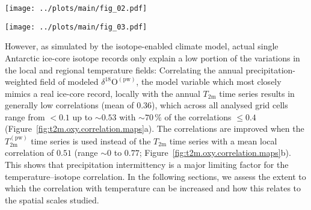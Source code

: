 \documentclass[draft]{agujournal2019}
\begin{document}
\begin{figure*}[t]%
\centering
\texttt{[image: ../plots/main/fig\_02.pdf]}
\caption{%
  Temperature decorrelation lengths across Antarctica. The temperature
  decorrelation lengths ($\tau$, in km) for each Antarctic model grid cell were
  estimated by fitting an exponential model to the correlation--distance
  relationship (cf.\ equation~\ref{eq:t2m.decorr}) obtained from correlating the
  local annual near-surface $T_{2\mathrm{m}}$ time series with the respective
  temperature time series from all other grid cells. Note that only the
  continental grid cells were used for the fit. Although the decorrelation
  lengths show a strong partition between East and West Antarctica, they
  are larger than $1000$\,km at most locations.}
\label{fig:t2m.decorrelation.map}%
\end{figure*}%

\begin{figure*}[t]%
\centering
\texttt{[image: ../plots/main/fig\_03.pdf]}
\caption{%
  The local temperature--isotope relationship across Antarctica. Shown are the
  local correlations for each model grid cell between the annual time series of
  precipitation-weighted oxygen isotope composition and of (\textbf{a})
  near-surface temperature and (\textbf{b}) precipitation-weighted near-surface
  temperature. The difference between the maps clearly demonstrates that
  precipitation intermittency is a major limiting factor for the
  temperature--isotope relationship.}
\label{fig:t2m.oxy.correlation.maps}%
\end{figure*}%

However, as simulated by the isotope-enabled climate model, actual single
Antarctic ice-core isotope records only explain a low portion of the variations
in the local and regional temperature fields: Correlating the annual
precipitation-weighted field of modeled
$\delta^{18}\mathrm{O}^{\mathrm{(pw)}}$, the model variable which most closely
mimics a real ice-core record, locally with the annual $T_{2\mathrm{m}}$ time
series results in generally low correlations (mean of $0.36$), which across all
analysed grid cells range from $<0.1$ up to $\sim0.53$ with $\sim70\,\%$ of the
correlations $\leq0.4$ (Figure~\ref{fig:t2m.oxy.correlation.maps}a). The
correlations are improved when the $T_{2\mathrm{m}}^{\mathrm{(pw)}}$ time series
is used instead of the $T_{2\mathrm{m}}$ time series with a mean local
correlation of $0.51$ (range $\sim0$ to $0.77$;
Figure~\ref{fig:t2m.oxy.correlation.maps}b). This shows that precipitation
intermittency is a major limiting factor for the temperature--isotope
correlation. In the following sections, we assess the extent to which the
correlation with temperature can be increased and how this relates to the
spatial scales studied.
\end{document}
